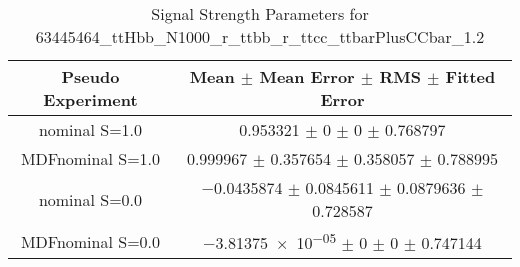 \begin{table}
\centering
\caption{Signal Strength Parameters for 63445464\_ttHbb\_N1000\_r\_ttbb\_r\_ttcc\_ttbarPlusCCbar\_1.2}
\begin{tabular}{cc}
\toprule
Pseudo Experiment & Mean $\pm$ Mean Error $\pm$ RMS $\pm$ Fitted Error\\
\midrule
nominal S=1.0 & \num{0.953321} $\pm$ \num{0} $\pm$ \num{0} $\pm$ \num{0.768797}\\
MDFnominal S=1.0 & \num{0.999967} $\pm$ \num{0.357654} $\pm$ \num{0.358057} $\pm$ \num{0.788995}\\
nominal S=0.0 & \num{-0.0435874} $\pm$ \num{0.0845611} $\pm$ \num{0.0879636} $\pm$ \num{0.728587}\\
MDFnominal S=0.0 & \num{-3.81375e-05} $\pm$ \num{0} $\pm$ \num{0} $\pm$ \num{0.747144}\\
\bottomrule
\end{tabular}
\end{table}